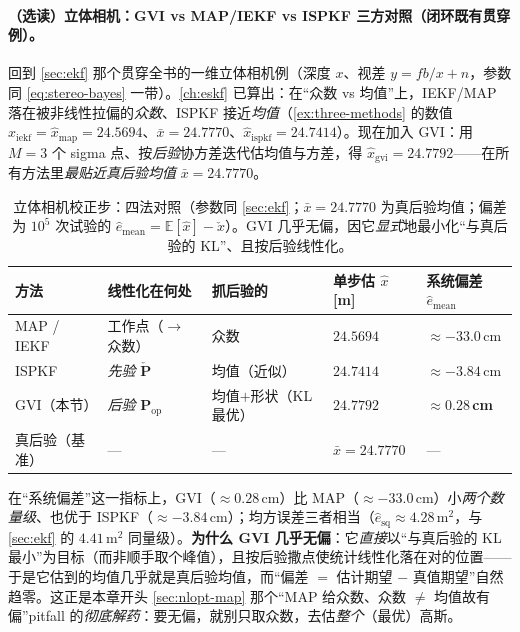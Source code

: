 \paragraph{（选读）立体相机：GVI vs MAP/IEKF vs ISPKF 三方对照（闭环既有贯穿例）。}
回到 \cref{sec:ekf} 那个贯穿全书的一维立体相机例（深度 $x$、视差 $y=fb/x+n$，参数同 \cref{eq:stereo-bayes} 一带）。\cref{ch:eskf} 已算出：在“众数 vs 均值”上，IEKF/MAP 落在被非线性拉偏的\emph{众数}、ISPKF 接近\emph{均值}（\cref{ex:three-methods} 的数值 $\hat{x}_{\text{iekf}}=\hat{x}_{\text{map}}=24.5694$、$\bar{x}=24.7770$、$\hat{x}_{\text{ispkf}}=24.7414$）。现在加入 GVI：用 $M=3$ 个 sigma 点、按\emph{后验}协方差迭代估均值与方差，得 $\hat{x}_{\text{gvi}}=24.7792$——在所有方法里\emph{最贴近真后验均值} $\bar{x}=24.7770$。
\begin{table}[H]\centering\small
\caption{立体相机校正步：四法对照（参数同 \cref{sec:ekf}；$\bar{x}=24.7770$ 为真后验均值；偏差为 $10^5$ 次试验的 $\hat{e}_{\text{mean}}=\mathbb{E}[\hat{x}]-\check{x}$）。GVI 几乎无偏，因它\emph{显式}地最小化“与真后验的 KL”、且按后验线性化。}
\label{tab:nlopt-gvi-stereo}
\begin{tabular}{lllll}
\toprule
方法 & 线性化在何处 & 抓后验的 & 单步估 $\hat{x}$ [m] & 系统偏差 $\hat{e}_{\text{mean}}$ \\
\midrule
MAP / IEKF & 工作点（$\to$众数） & 众数 & $24.5694$ & $\approx-33.0$\,cm \\
ISPKF & \emph{先验} $\check{\mathbf{P}}$ & 均值（近似） & $24.7414$ & $\approx-3.84$\,cm \\
GVI（本节） & \emph{后验} $\mathbf{P}_{\mathrm{op}}$ & 均值$+$形状（KL 最优） & $\mathbf{24.7792}$ & $\boldsymbol{\approx0.28}$\,\textbf{cm} \\
真后验（基准） & — & — & $\bar{x}=24.7770$ & — \\
\bottomrule
\end{tabular}
\end{table}
\noindent 在“系统偏差”这一指标上，GVI（$\approx0.28$\,cm）比 MAP（$\approx-33.0$\,cm）小\emph{两个数量级}、也优于 ISPKF（$\approx-3.84$\,cm）；均方误差三者相当（$\hat{e}_{\text{sq}}\approx4.28$\,m$^2$，与 \cref{sec:ekf} 的 $4.41$\,m$^2$ 同量级）。\textbf{为什么 GVI 几乎无偏}：它\emph{直接}以“与真后验的 KL 最小”为目标（而非顺手取个峰值），且按后验撒点使统计线性化落在对的位置——于是它估到的均值几乎就是真后验均值，而“偏差 $=$ 估计期望 $-$ 真值期望”自然趋零。这正是本章开头 \cref{sec:nlopt-map} 那个“MAP 给众数、众数 $\ne$ 均值故有偏”pitfall 的\emph{彻底解药}：要无偏，就别只取众数，去估\emph{整个}（最优）高斯。

